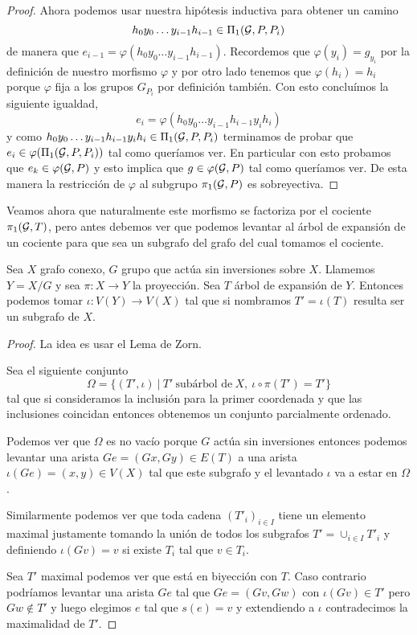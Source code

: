 \documentclass[tesis.tex]{subfiles}
\begin{document}
\begin{proof}
	Ahora podemos usar nuestra hipótesis inductiva para obtener un camino 
	\[
		h_0y_0 \dots y_{i-1}h_{i-1} \in \Pi_1({\cal G}, P, P_i)
	\]
	de manera que $e_{i-1} =  \varphi(h_0y_0 \dots y_{i-1}h_{i-1})$. 
	Recordemos que $\varphi(y_i) = g_{y_i}$ por la definición de nuestro morfismo $\varphi$ y por otro lado tenemos que $\varphi(h_i) = h_i$ porque $\varphi$ fija a los grupos $G_{P_i}$ por definición también.
	Con esto concluímos la siguiente igualdad,
	\[
		e_i = \varphi(h_0y_0 \dots y_{i-1}h_{i-1} y_i h_i)
	\]
	y como $h_0y_0 \dots y_{i-1}h_{i-1} y_i h_i \in \Pi_1({\cal G}, P, P_i)$ terminamos de probar que $e_{i} \in \varphi(\Pi_1({\cal G}, P, P_i))$ tal como queríamos ver. 
	En particular con esto probamos que $e_k \in \varphi({\cal G}, P)$ y esto implica que $g \in \varphi({\cal G}, P)$ tal como queríamos ver.
	De esta manera la restricción de $\varphi$ al subgrupo $\pi_1({\cal G}, P)$ es sobreyectiva.
\end{proof}

Veamos ahora que naturalmente este morfismo se factoriza por el cociente $\pi_1({\cal G}, T)$, pero antes debemos ver que podemos levantar al árbol de expansión de un cociente para que sea un subgrafo del grafo del cual tomamos el cociente.

\begin{prop}
	Sea $X$ grafo conexo, $G$ grupo que actúa sin inversiones sobre $X$.
	Llamemos $Y= X / G$ y sea $\pi:X \to Y$ la proyección. 
	Sea $T$ árbol de expansión de $Y$.
	Entonces podemos tomar $\iota:V(Y) \to V(X)$ tal que si nombramos $T' = \iota(T)$ resulta ser un subgrafo de $X$.
\end{prop}

\begin{proof}
	La idea es usar el Lema de Zorn.
	
	Sea el siguiente conjunto
	\[
		\Omega = \{ (T', \iota)	  \ | \   T' \ \text{subárbol de} \ X, \ \iota \circ \pi(T') = T' \}
	\]
	tal que si consideramos la inclusión para la primer coordenada y que las inclusiones coincidan entonces obtenemos un conjunto parcialmente ordenado.
	
	Podemos ver que $\Omega$ es no vacío porque $G$ actúa sin inversiones entonces podemos levantar una arista $Ge = (Gx,Gy) \in E(T)$ a una arista $\iota (Ge) = (x,y) \in V(X)$ tal que este subgrafo y el levantado $\iota$ va a estar en $\Omega$.
	
	Similarmente podemos ver que toda cadena $(T'_i)_{i \in I}$ tiene un elemento maximal justamente tomando la unión de todos los subgrafos $T' = \cup_{i \in I} T'_{i}$ y definiendo $\iota(Gv) = v$ si existe $T_{i}$ tal que $v \in T_{i}$.
	
	Sea $T'$ maximal podemos ver que está en biyección con $T$.
	Caso contrario podríamos levantar una arista $Ge$ tal que $Ge=(Gv,Gw)$ con $\iota(Gv) \in T'$ pero $Gw \notin T'$ y luego elegimos $e$ tal que $s(e) = v$ y extendiendo a $\iota$ contradecimos la maximalidad de $T'$.	
\end{proof}
\end{document}
